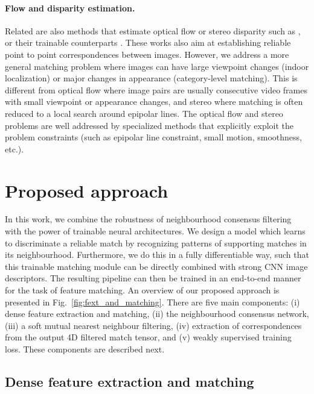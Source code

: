 \documentclass{article}
\begin{document}
\paragraph{Flow and disparity estimation.}
Related are also methods that estimate optical flow or stereo disparity such as \cite{lucas1981iterative,horn1981determining,Hirschmuller08,sun2010secrets,brox2011large}, or their trainable counterparts \cite{flownet,pwc,gcnet}. These works also aim at establishing reliable point to point correspondences between images. However, we address a more general matching problem where images can have large viewpoint changes (indoor localization) or major changes in appearance (category-level matching). This is different from optical flow where image pairs are usually consecutive video frames with small viewpoint or appearance changes, and stereo where matching is often reduced to a local search around epipolar lines. The optical flow and stereo problems are well addressed by specialized methods that explicitly exploit the problem constraints (such as epipolar line constraint, small motion, smoothness, etc.).

\section{Proposed approach}

In this work, we combine the robustness of neighbourhood consensus filtering with the power of trainable neural architectures. We design a model which learns to discriminate a reliable match by recognizing patterns of supporting matches in its neighbourhood. Furthermore, we do this in a fully differentiable way, such that this trainable matching
module can be directly combined with strong CNN image descriptors. The resulting pipeline can then be trained in an end-to-end manner for the task of feature matching. An overview of our proposed approach is presented in Fig.~\ref{fig:fext_and_matching}. There are five main components: (i) dense feature extraction and matching, (ii) the neighbourhood consensus network, (iii) a soft mutual nearest neighbour filtering, (iv) extraction of correspondences from the output 4D filtered match tensor, and (v) weakly supervised training loss. These components are described next.

\subsection{Dense feature extraction and matching}
\end{document}
